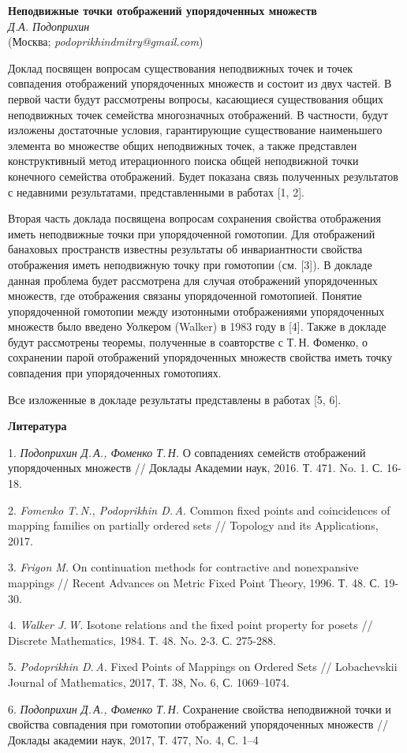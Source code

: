 \begin{center}{ \bf Неподвижные точки отображений упорядоченных множеств}\\
{\it Д.А. Подоприхин } \\
(Москва; {\it podoprikhindmitry@gmail.com})
\end{center}


Доклад посвящен вопросам существования неподвижных точек и точек совпадения  отображений упорядоченных множеств и состоит из двух частей.
В первой части будут рассмотрены вопросы, касающиеся существования общих неподвижных точек семейства многозначных отображений. В частности, будут изложены
достаточные условия, гарантирующие существование наименьшего элемента во множестве
общих неподвижных точек, а также представлен конструктивный метод итерационного поиска общей неподвижной точки конечного семейства отображений.
Будет показана связь полученных результатов с недавними результатами, представленными в работах [1, 2].


Вторая часть доклада посвящена вопросам сохранения свойства отображения иметь неподвижные точки при упорядоченной гомотопии. Для отображений банаховых пространств известны результаты об инвариантности свойства отображения иметь неподвижную точку при гомотопии (см. [3]). В докладе
данная проблема будет рассмотрена для случая отображений упорядоченных множеств,
где отображения связаны упорядоченной гомотопией. Понятие упорядоченной гомотопии между изотонными отображениями упорядоченных множеств было введено Уолкером
(Walker) в 1983 году в [4]. Также в докладе будут рассмотрены теоремы, полученные в соавторстве с Т.\,Н. Фоменко, о сохранении парой отображений упорядоченных множеств свойства иметь точку совпадения при упорядоченных гомотопиях.

Все изложенные в докладе результаты представлены в работах [5, 6].



\smallskip \centerline{\bf Литература}\nopagebreak

1. {\it Подоприхин Д.\,А., Фоменко Т.\,Н.} О совпадениях семейств отображений упорядоченных множеств // Доклады Академии наук, 2016. Т. 471. No. 1. С. 16-18.

2. {\it Fomenko T.\,N., Podoprikhin D.\,A.} Common fixed points and coincidences of mapping families on partially ordered sets // Topology and its Applications, 2017.

3. {\it Frigon M.} On continuation methods for contractive and nonexpansive mappings // Recent Advances on Metric Fixed Point Theory, 1996. Т. 48. С. 19-30.

4. {\it  Walker J.\,W.} Isotone relations and the fixed point property for posets // Discrete Mathematics, 1984. Т. 48. No. 2-3. С. 275-288.

5. {\it Podoprikhin D.\,A.} Fixed Points of Mappings on Ordered Sets // Lobachevskii Journal of Mathematics, 2017, Т. 38, No. 6, С. 1069–1074.

6. {\it Подоприхин Д.\,А., Фоменко Т.\,Н.} Сохранение свойства неподвижной точки и свойства совпадения при гомотопии отображений упорядоченных множеств // Доклады академии наук, 2017, Т. 477, No. 4, С. 1–4
